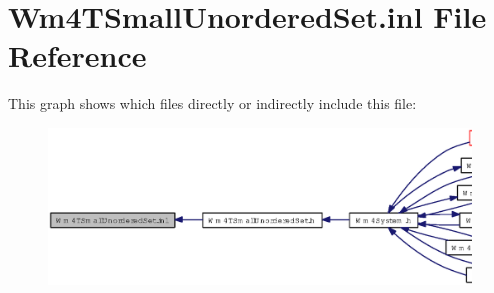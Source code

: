 \section{Wm4TSmall\-Unordered\-Set.inl File Reference}
\label{Wm4TSmallUnorderedSet_8inl}


This graph shows which files directly or indirectly include this file:\begin{figure}[H]
\begin{center}
\leavevmode
\includegraphics[width=353pt]{Wm4TSmallUnorderedSet_8inl__dep__incl}
\end{center}
\end{figure}
